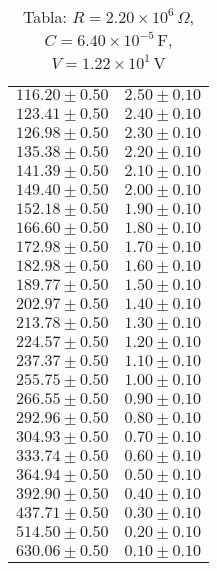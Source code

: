 \begin{table}[H]
\begin{tabular}{|c|c|}
$116.20 \pm 0.50$ & $2.50 \pm 0.10$ \\
$123.41 \pm 0.50$ & $2.40 \pm 0.10$ \\
$126.98 \pm 0.50$ & $2.30 \pm 0.10$ \\
$135.38 \pm 0.50$ & $2.20 \pm 0.10$ \\
$141.39 \pm 0.50$ & $2.10 \pm 0.10$ \\
$149.40 \pm 0.50$ & $2.00 \pm 0.10$ \\
$152.18 \pm 0.50$ & $1.90 \pm 0.10$ \\
$166.60 \pm 0.50$ & $1.80 \pm 0.10$ \\
$172.98 \pm 0.50$ & $1.70 \pm 0.10$ \\
$182.98 \pm 0.50$ & $1.60 \pm 0.10$ \\
$189.77 \pm 0.50$ & $1.50 \pm 0.10$ \\
$202.97 \pm 0.50$ & $1.40 \pm 0.10$ \\
$213.78 \pm 0.50$ & $1.30 \pm 0.10$ \\
$224.57 \pm 0.50$ & $1.20 \pm 0.10$ \\
$237.37 \pm 0.50$ & $1.10 \pm 0.10$ \\
$255.75 \pm 0.50$ & $1.00 \pm 0.10$ \\
$266.55 \pm 0.50$ & $0.90 \pm 0.10$ \\
$292.96 \pm 0.50$ & $0.80 \pm 0.10$ \\
$304.93 \pm 0.50$ & $0.70 \pm 0.10$ \\
$333.74 \pm 0.50$ & $0.60 \pm 0.10$ \\
$364.94 \pm 0.50$ & $0.50 \pm 0.10$ \\
$392.90 \pm 0.50$ & $0.40 \pm 0.10$ \\
$437.71 \pm 0.50$ & $0.30 \pm 0.10$ \\
$514.50 \pm 0.50$ & $0.20 \pm 0.10$ \\
$630.06 \pm 0.50$ & $0.10 \pm 0.10$ \\
\hline
\end{tabular}
\caption*{Tabla: $R = 2.20 \times 10^{6}\,\Omega$, $C = 6.40 \times 10^{-5}$\,F, $V = 1.22 \times 10^{1}$\,V}
\end{table}
